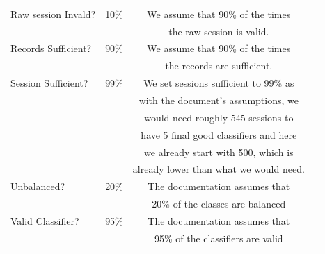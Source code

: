 \begin{table}[H]
\begin{tabularx}{\textwidth}{|X|c|c|c|}
    \hline
    Raw session Invald? & 10\% & We assume that 90\% of the times
    \\ & & the raw session is valid.\\
    \hline
    Records Sufficient? & 90\% & We assume that 90\% of the times
    \\ & & the records are sufficient.\\
    \hline
    Session Sufficient? & 99\% & We set sessions sufficient to 99\% as
    \\ & & with the document's assumptions, we 
    \\ & & would need roughly 545 sessions to 
    \\ & & have 5 final good classifiers and here
    \\ & &  we already start with 500, which is
    \\ & & already lower than what we would need.\\
    \hline
    Unbalanced? & 20\% & The documentation assumes that
    \\ & &  20\% of the classes are balanced\\
    \hline
    Valid Classifier? & 95\% & The documentation assumes that
    \\ & &  95\% of the classifiers are valid\\
    \hline

\end{tabularx}
\end{table}
